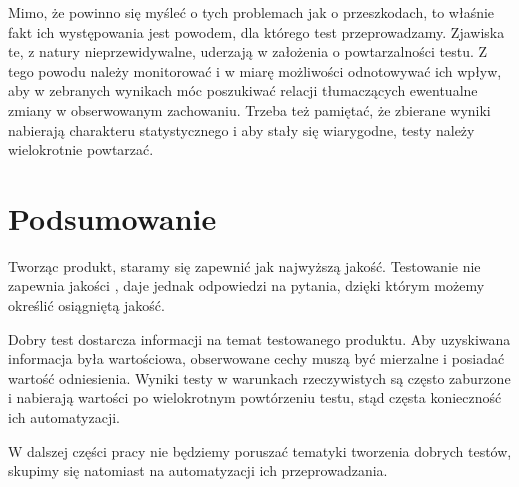 \documentclass[00-praca-magisterska.tex]{subfiles}
\begin{document}
Mimo, że powinno się myśleć o tych problemach jak o przeszkodach, to właśnie
fakt ich występowania jest powodem, dla którego test przeprowadzamy. Zjawiska
te, z natury nieprzewidywalne, uderzają w założenia o powtarzalności testu. Z
tego powodu należy monitorować i w miarę możliwości odnotowywać ich wpływ, aby
w zebranych wynikach móc poszukiwać relacji tłumaczących ewentualne zmiany w
obserwowanym zachowaniu. Trzeba też pamiętać, że zbierane wyniki nabierają
charakteru statystycznego i aby stały się wiarygodne, testy należy wielokrotnie
powtarzać.

\section{Podsumowanie}
\label{testowanie-podsumowanie}

Tworząc produkt, staramy się zapewnić jak najwyższą jakość. Testowanie nie
zapewnia jakości \cite{good-test}, daje jednak odpowiedzi na pytania, dzięki
którym możemy określić osiągniętą jakość.

Dobry test dostarcza informacji na temat testowanego produktu. Aby uzyskiwana
informacja była wartościowa, obserwowane cechy muszą być mierzalne i posiadać
wartość odniesienia.  Wyniki testy w warunkach rzeczywistych są często
zaburzone i nabierają wartości po wielokrotnym powtórzeniu testu, stąd częsta
konieczność ich automatyzacji.

W dalszej części pracy nie będziemy poruszać tematyki tworzenia dobrych testów,
skupimy się natomiast na automatyzacji ich przeprowadzania.
\end{document}
